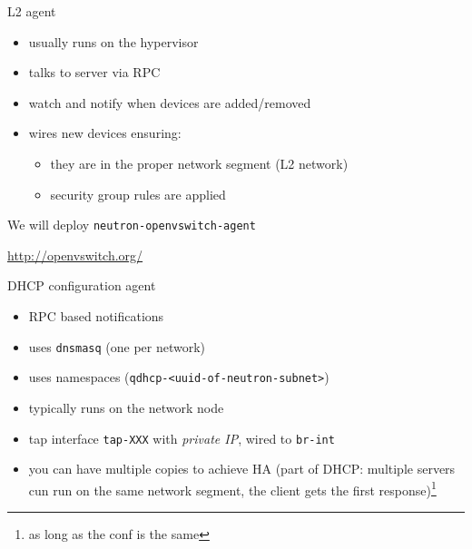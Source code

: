 \documentclass[english,serif,mathserif,xcolor=pdftex,dvipsnames,table]{beamer}
\begin{document}
\begin{frame}
  {L2 agent}
  \begin{itemize}
  \item usually runs on the hypervisor
  \item talks to server via RPC
  \item watch and notify when devices are added/removed
  \item wires new devices ensuring:
    \begin{itemize}
    \item they are in the proper network segment (L2 network)
    \item security group rules are applied
    \end{itemize}
  \end{itemize}

  \+
  We will deploy \texttt{neutron-openvswitch-agent}

  \+
  {\footnotesize\url{http://openvswitch.org/}}
\end{frame}




\begin{frame}
  {DHCP configuration agent}
  \begin{itemize}
  \item RPC based notifications
  \item uses \texttt{dnsmasq} (one per network)
  \item uses namespaces (\texttt{qdhcp-<uuid-of-neutron-subnet>})
  \item typically runs on the network node
  \item tap interface \texttt{tap-XXX} with \textit{private IP}, wired
    to \texttt{br-int}
  \item you can have multiple copies to achieve HA (part of DHCP:
    multiple servers cun run on the same network segment, the client
    gets the first response)\footnote{as long as the conf is the same}
  \end{itemize}
\end{frame}
\end{document}
